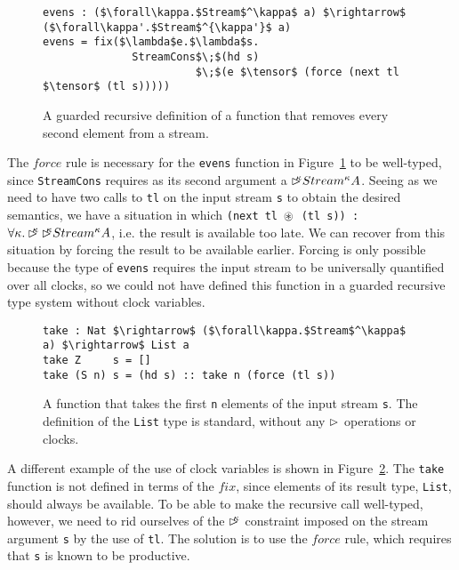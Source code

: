 \begin{figure}
\begin{lstlisting}[mathescape]
evens : ($\forall\kappa.$Stream$^\kappa$ a) $\rightarrow$ ($\forall\kappa'.$Stream$^{\kappa'}$ a)
evens = fix($\lambda$e.$\lambda$s.
              StreamCons$\;$(hd s) 
                        $\;$(e $\tensor$ (force (next tl $\tensor$ (tl s)))))
\end{lstlisting}
\caption{A guarded recursive definition of a function that removes every second element from a stream.}
\label{fig:guarded_recursion_evens}
\end{figure}
The $force$ rule is necessary for the \texttt{evens} function in Figure~\ref{fig:guarded_recursion_evens} to be well-typed, since \texttt{StreamCons} requires as its second argument a $\rhd^{\!\!\!\kappa}Stream^\kappa A$. Seeing as we need to have two calls to \texttt{tl} on the input stream \texttt{s} to obtain the desired semantics, we have a situation in which \texttt{(next tl $\circledast$ (tl s)) :} $\forall\kappa.\rhd^{\!\!\!\kappa}\rhd^{\!\!\!\kappa}Stream^\kappa A$, i.e. the result is available too late. We can recover from this situation by forcing the result to be available earlier. Forcing is only possible because the type of \texttt{evens} requires the input stream to be universally quantified over all clocks, so we could not have defined this function in a guarded recursive type system without clock variables.
\begin{figure}
\begin{lstlisting}[mathescape]
take : Nat $\rightarrow$ ($\forall\kappa.$Stream$^\kappa$ a) $\rightarrow$ List a
take Z     s = []
take (S n) s = (hd s) :: take n (force (tl s))
\end{lstlisting}
\caption{A function that takes the first \texttt{n} elements of the input stream \texttt{s}. The definition of the \texttt{List} type is standard, without any $\rhd$ operations or clocks.}
\label{fig:guarded_recursion_take}
\end{figure}

A different example of the use of clock variables is shown in Figure~\ref{fig:guarded_recursion_take}. The \texttt{take} function is not defined in terms of the $fix$, since elements of its result type, \texttt{List}, should always be available. To be able to make the recursive call well-typed, however, we need to rid ourselves of the $\rhd^{\!\!\!\kappa}$ constraint imposed on the stream argument \texttt{s} by the use of \texttt{tl}. The solution is to use the $force$ rule, which requires that \texttt{s} is known to be productive. 

